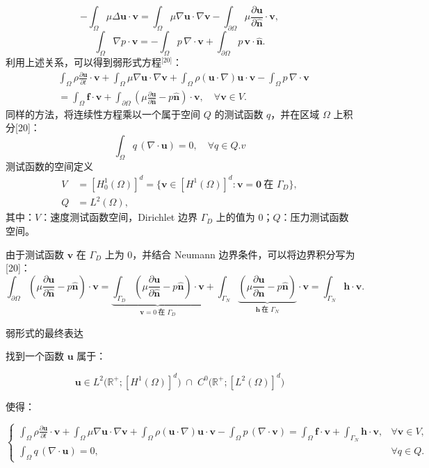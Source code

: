 $$
-\int_{\Omega} \mu \Delta \mathbf{u} \cdot \mathbf{v}
= \int_{\Omega} \mu \nabla \mathbf{u} \cdot \nabla \mathbf{v}
- \int_{\partial \Omega} \mu 
\frac{\partial \mathbf{u}}{\partial \hat{\mathbf{n}}} 
\cdot \mathbf{v},~
$$
$$
\int_{\Omega} \nabla p \cdot \mathbf{v}
= -\int_{\Omega} p \, \nabla \cdot \mathbf{v}
+ \int_{\partial \Omega} p \, \mathbf{v} \cdot \hat{\mathbf{n}}.~
$$
利用上述关系，可以得到弱形式方程\(^\text{[20]}\)：
$$
\begin{aligned}
&\int_{\Omega} 
\rho \frac{\partial \mathbf{u}}{\partial t} \cdot \mathbf{v}
+ \int_{\Omega} 
\mu \nabla \mathbf{u} \cdot \nabla \mathbf{v}
+ \int_{\Omega} 
\rho (\mathbf{u} \cdot \nabla) \mathbf{u} \cdot \mathbf{v}
- \int_{\Omega} 
p \, \nabla \cdot \mathbf{v} \\
&= 
\int_{\Omega} 
\mathbf{f} \cdot \mathbf{v}
+ \int_{\partial \Omega} 
\left(
\mu \frac{\partial \mathbf{u}}{\partial \hat{\mathbf{n}}}
- p \hat{\mathbf{n}}
\right) 
\cdot \mathbf{v},
\quad
\forall \mathbf{v} \in V.
\end{aligned}~
$$
同样的方法，将连续性方程乘以一个属于空间 $Q$ 的测试函数 $q$，并在区域 $\Omega$ 上积分[20]：
$$
\int_{\Omega} q \, (\nabla \cdot \mathbf{u}) = 0,
\quad \forall q \in Q.v~
$$
测试函数的空间定义
$$
\begin{aligned}
V &= [H_0^1(\Omega)]^d
= \big\{ \mathbf{v} \in [H^1(\Omega)]^d : 
\mathbf{v} = \mathbf{0} \ \text{在 } \Gamma_D \big\},\\
Q &= L^2(\Omega),
\end{aligned}~
$$
其中：$V$：速度测试函数空间，Dirichlet 边界 $\Gamma_D$ 上的值为 0；$Q$：压力测试函数空间。

由于测试函数 $\mathbf{v}$ 在 $\Gamma_D$ 上为 0，并结合 Neumann 边界条件，可以将边界积分写为[20]：
$$
\int_{\partial \Omega}
\left(
\mu \frac{\partial \mathbf{u}}{\partial \hat{\mathbf{n}}}
- p \hat{\mathbf{n}}
\right) \cdot \mathbf{v}
=
\underbrace{
\int_{\Gamma_D}
\left(
\mu \frac{\partial \mathbf{u}}{\partial \hat{\mathbf{n}}}
- p \hat{\mathbf{n}}
\right) \cdot \mathbf{v}
}_{\mathbf{v}=0 \ \text{在 } \Gamma_D}
+
\int_{\Gamma_N}
\underbrace{
\left(
\mu \frac{\partial \mathbf{u}}{\partial \hat{\mathbf{n}}}
- p \hat{\mathbf{n}}
\right)
}_{\mathbf{h} \ \text{在 } \Gamma_N}
\cdot \mathbf{v}
=
\int_{\Gamma_N}
\mathbf{h} \cdot \mathbf{v}.~
$$

弱形式的最终表达

找到一个函数 $\mathbf{u}$ 属于：

$$
\mathbf{u} \in
L^2\big(\mathbb{R}^+; [H^1(\Omega)]^d\big)
\;\cap\;
C^0\big(\mathbb{R}^+; [L^2(\Omega)]^d\big)~
$$

使得：

$$
\begin{cases}
\displaystyle
\int_{\Omega} \rho \frac{\partial \mathbf{u}}{\partial t} \cdot \mathbf{v}
+ \int_{\Omega} \mu \nabla \mathbf{u} \cdot \nabla \mathbf{v}
+ \int_{\Omega} \rho (\mathbf{u} \cdot \nabla) \mathbf{u} \cdot \mathbf{v}
- \int_{\Omega} p \, (\nabla \cdot \mathbf{v})
= \int_{\Omega} \mathbf{f} \cdot \mathbf{v}
+ \int_{\Gamma_N} \mathbf{h} \cdot \mathbf{v},
& \forall \mathbf{v} \in V, \\[8pt]
\displaystyle
\int_{\Omega} q \, (\nabla \cdot \mathbf{u})
= 0,
& \forall q \in Q.
\end{cases}~
$$
